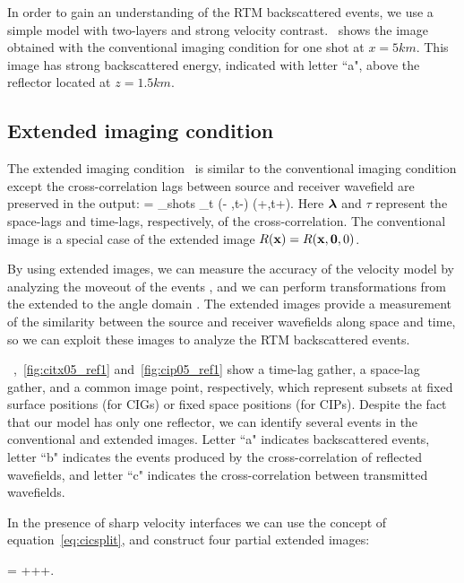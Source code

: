 In order to gain an understanding of the RTM backscattered events, we use a simple model with two-layers and strong velocity
contrast.~ shows the image obtained with the conventional imaging condition for one shot at $x=5km$. This image has strong 
backscattered energy, indicated with letter ``a", above the reflector located at $z=1.5km$.

\subsection{Extended imaging condition}

The extended imaging condition~\citep{rickett:883,sava:S209,GPR:GPR888} is similar to the conventional imaging condition
 except the cross-correlation lags between source and receiver wavefield are preserved in the output:
\beq
\Re= \sum_{shots} \sum_{t} \US(\xx - \hh,t-\tau) \UR(\xx+\hh,t+\tau).
\label{eq:eic}
\eeq
Here ${\boldsymbol{\lambda}}$ and $\tau$ represent the space-lags and time-lags, respectively, of the cross-correlation.
%
The conventional image is a special case of the extended image $R({\bf x})=R({\bf x},{\bf 0},0)$.

By using extended images, we can measure the accuracy of the velocity model by analyzing the moveout of the events
 \citep{yang:S151}, and we can perform transformations from the extended to the angle domain 
\citep{sava:1065,sava:S209,sava:S131}. The extended images provide a measurement of the similarity between the source
 and receiver wavefields along space and time, so we can exploit these images to analyze the RTM backscattered events.


~,~\ref{fig:citx05_ref1} and~\ref{fig:cip05_ref1} show a time-lag gather, a space-lag gather,
 and a common image point, respectively, which represent subsets at fixed surface positions (for CIGs) or fixed space positions 
(for CIPs). Despite the fact that our model has only one reflector, we can identify several events in the conventional and extended images. 
Letter ``a" indicates backscattered events, letter ``b" indicates the events produced by the cross-correlation of 
reflected wavefields, and letter ``c" indicates the cross-correlation between transmitted wavefields.

In the presence of sharp velocity interfaces we can use the concept of equation~\ref{eq:cicsplit}, and construct four partial 
extended images:

\beq
 \Re= +++.
\label{eq:eicsplit}
\eeq


